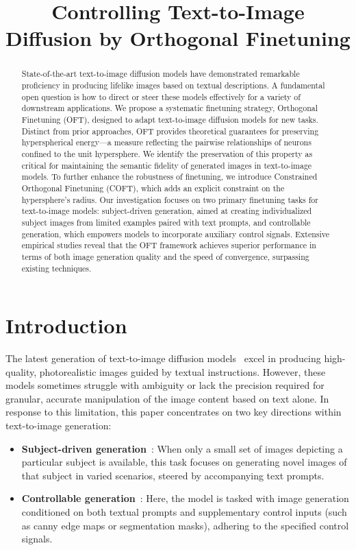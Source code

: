 \title{Controlling Text-to-Image Diffusion by Orthogonal Finetuning}

\begin{abstract}
State-of-the-art text-to-image diffusion models have demonstrated remarkable proficiency in producing lifelike images based on textual descriptions. A fundamental open question is how to direct or steer these models effectively for a variety of downstream applications. We propose a systematic finetuning strategy, Orthogonal Finetuning (OFT), designed to adapt text-to-image diffusion models for new tasks. Distinct from prior approaches, OFT provides theoretical guarantees for preserving hyperspherical energy—a measure reflecting the pairwise relationships of neurons confined to the unit hypersphere. We identify the preservation of this property as critical for maintaining the semantic fidelity of generated images in text-to-image models. To further enhance the robustness of finetuning, we introduce Constrained Orthogonal Finetuning (COFT), which adds an explicit constraint on the hypersphere's radius. Our investigation focuses on two primary finetuning tasks for text-to-image models: subject-driven generation, aimed at creating individualized subject images from limited examples paired with text prompts, and controllable generation, which empowers models to incorporate auxiliary control signals. Extensive empirical studies reveal that the OFT framework achieves superior performance in terms of both image generation quality and the speed of convergence, surpassing existing techniques.
\end{abstract}

\section{Introduction}

The latest generation of text-to-image diffusion models~\cite{saharia2022photorealistic,ramesh2022hierarchical,rombach2022high} excel in producing high-quality, photorealistic images guided by textual instructions. However, these models sometimes struggle with ambiguity or lack the precision required for granular, accurate manipulation of the image content based on text alone. In response to this limitation, this paper concentrates on two key directions within text-to-image generation:

\begin{itemize}[leftmargin=*,nosep]

    \item \textbf{Subject-driven generation}~\cite{ruiz2023dreambooth}: When only a small set of images depicting a particular subject is available, this task focuses on generating novel images of that subject in varied scenarios, steered by accompanying text prompts.
    \item \textbf{Controllable generation}~\cite{zhang2023adding,mou2023t2i}: Here, the model is tasked with image generation conditioned on both textual prompts and supplementary control inputs (such as canny edge maps or segmentation masks), adhering to the specified control signals.
\end{itemize}

